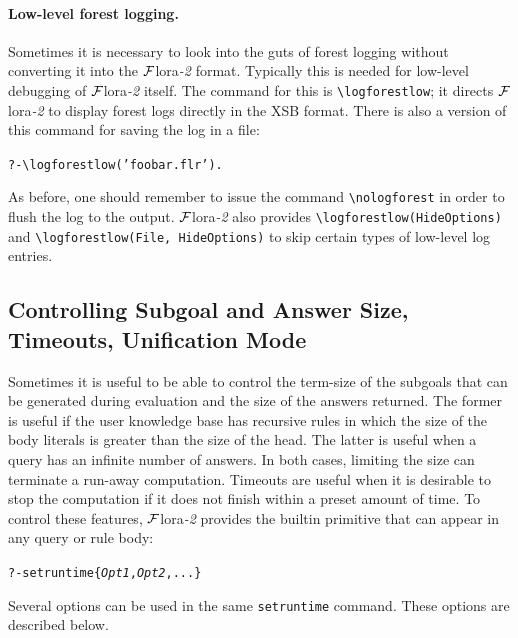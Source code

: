 \documentclass[11pt]{article}
\newcommand{\FLORA}{{\mbox{\sc ${\cal F}${lora}\rm\emph{-2}}}\xspace}
\newcommand{\FLSYSTEM}{\FLORA}
\newcommand{\flrext}{flr\xspace}
\newcommand{\bs}{\textbackslash}
\begin{document}
\paragraph{Low-level forest logging.}
Sometimes it is necessary to look into the guts of forest logging without
converting it into the \FLSYSTEM format. Typically this is needed for
low-level debugging of \FLSYSTEM itself.
The command for this is
{\tt \bs{}logforestlow}; it directs \FLSYSTEM to display forest logs 
directly in the XSB format.
There is also a version of this command for saving the log in a file:
\begin{alltt}
   ?- \bs{}logforestlow('foobar.\flrext').
\end{alltt}
As before, one should remember to issue the command \texttt{\bs{}nologforest}
in order to flush the log to the output.
\FLSYSTEM also provides {\tt \bs{}logforestlow(HideOptions)} and 
{\tt \bs{}logforestlow(File, HideOptions)} to skip certain types of low-level 
log entries. 

\subsection{Controlling Subgoal and Answer Size, Timeouts, Unification
  Mode}\label{sec-timeout}

Sometimes it is useful to be able to control the term-size of the subgoals
that can be generated during evaluation and the size of the answers
returned. The former is useful if the user knowledge base has recursive
rules in which the size of the body literals is greater than the size of
the head. The latter is useful when a query has an infinite number of
answers. In both cases, limiting the size can terminate a run-away
computation.
Timeouts are useful when it is desirable to stop the computation if it does
not finish within a preset amount of time.
To control these features, \FLSYSTEM provides the builtin primitive that
can appear in any query or rule body:
\begin{alltt}
   ?- setruntime\{\emph{Opt1},\emph{Opt2},...\}
\end{alltt}
Several options can be used in the same \texttt{setruntime} command. 
These options are described below.
\end{document}
